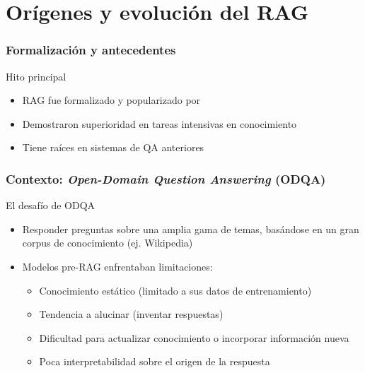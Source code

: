 \documentclass[handout]{beamer}
\begin{document}
\section{Orígenes y evolución del RAG}

\begin{frame}
  \frametitle{Formalización y antecedentes}
  \begin{block}{Hito principal}
    \begin{itemize}
      \item RAG fue formalizado y popularizado por \textcite{Lewis2020RAG}
      \item Demostraron superioridad en tareas intensivas en conocimiento
      \item Tiene raíces en sistemas de QA anteriores
    \end{itemize}
  \end{block}
\end{frame}

\begin{frame}
  \frametitle{Contexto: \textit{Open-Domain Question Answering} (ODQA)}
  \begin{block}{El desafío de ODQA}
    \begin{itemize}
      \item Responder preguntas sobre una amplia gama de temas, basándose en un gran corpus de conocimiento (ej. Wikipedia)
      \item Modelos pre-RAG enfrentaban limitaciones:
        \begin{itemize}
            \item Conocimiento estático (limitado a sus datos de entrenamiento)
            \item Tendencia a alucinar (inventar respuestas)
            \item Dificultad para actualizar conocimiento o incorporar información nueva
            \item Poca interpretabilidad sobre el origen de la respuesta
        \end{itemize}
    \end{itemize}
  \end{block}
\end{frame}
\end{document}
